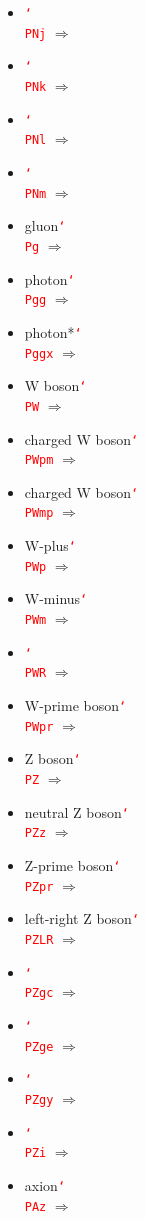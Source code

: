\documentclass[12pt]{article}
\newcommand{\texcmd}[1]{\textcolor{red}{\texttt{\char`\\#1}}}
\begin{document}
\begin{multicols}{2}
{\begin{itemize}
\item  \texcmd{PNj} $\Rightarrow$ \PNj
\item  \texcmd{PNk} $\Rightarrow$ \PNk
\item  \texcmd{PNl} $\Rightarrow$ \PNl
\item  \texcmd{PNm} $\Rightarrow$ \PNm
\item gluon\newline \texcmd{Pg} $\Rightarrow$ \Pg
\item photon\newline \texcmd{Pgg} $\Rightarrow$ \Pgg
\item photon*\newline \texcmd{Pggx} $\Rightarrow$ \Pggx
\item W boson\newline \texcmd{PW} $\Rightarrow$ \PW
\item charged W boson\newline \texcmd{PWpm} $\Rightarrow$ \PWpm
\item charged W boson\newline \texcmd{PWmp} $\Rightarrow$ \PWmp
\item W-plus\newline \texcmd{PWp} $\Rightarrow$ \PWp
\item W-minus\newline \texcmd{PWm} $\Rightarrow$ \PWm
\item  \texcmd{PWR} $\Rightarrow$ \PWR
\item W-prime boson\newline \texcmd{PWpr} $\Rightarrow$ \PWpr
\item Z boson\newline \texcmd{PZ} $\Rightarrow$ \PZ
\item neutral Z boson\newline \texcmd{PZz} $\Rightarrow$ \PZz
\item Z-prime boson\newline \texcmd{PZpr} $\Rightarrow$ \PZpr
\item left-right Z boson\newline \texcmd{PZLR} $\Rightarrow$ \PZLR
\item  \texcmd{PZgc} $\Rightarrow$ \PZgc
\item  \texcmd{PZge} $\Rightarrow$ \PZge
\item  \texcmd{PZgy} $\Rightarrow$ \PZgy
\item  \texcmd{PZi} $\Rightarrow$ \PZi
\item axion\newline \texcmd{PAz} $\Rightarrow$ \PAz

\end{itemize}}
\end{multicols}
\end{document}
